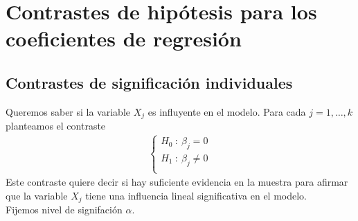 \section{Contrastes de hipótesis para los coeficientes de regresión}

\subsection{Contrastes de significación individuales}
\noindent Queremos saber si la variable $X_j$ es influyente en el modelo. Para cada $j = 1,\ldots,k$ planteamos el contraste
\begin{align*}
    \left\{ \begin{array}{lcc}
             H_0 \ : \ \beta_j = 0\\
             H_1 \ : \ \beta_j \not = 0 \\
             \end{array}
   \right.
\end{align*}
Este contraste quiere decir si hay suficiente evidencia en la muestra para afirmar que la variable $X_j$ tiene una influencia lineal significativa en el modelo.
\\
\newline
Fijemos nivel de signifación $\alpha$.

